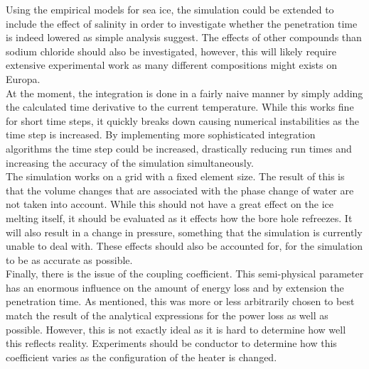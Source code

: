 \noindent
Using the empirical models for sea ice, the simulation could be extended to include the effect of salinity in order to investigate whether the penetration time is indeed lowered as simple analysis suggest. The effects of other compounds than sodium chloride should also be investigated, however, this will likely require extensive experimental work as many different compositions might exists on Europa.\\

\noindent
At the moment, the integration is done in a fairly naive manner by simply adding the calculated time derivative to the current temperature. While this works fine for short time steps, it quickly breaks down causing numerical instabilities as the time step is increased. By implementing more sophisticated integration algorithms the time step could be increased, drastically reducing run times and increasing the accuracy of the simulation simultaneously.\\

\noindent
The simulation works on a grid with a fixed element size. The result of this is that the volume changes that are associated with the phase change of water are not taken into account. While this should not have a great effect on the ice melting itself, it should be evaluated as it effects how the bore hole refreezes. It will also result in a change in pressure, something that the simulation is currently unable to deal with. These effects should also be accounted for, for the simulation to be as accurate as possible.\\

\noindent
Finally, there is the issue of the coupling coefficient. This semi-physical parameter has an enormous influence on the amount of energy loss and by extension the penetration time. As mentioned, this was more or less arbitrarily chosen to best match the result of the analytical expressions for the power loss as well as possible. However, this is not exactly ideal as it is hard to determine how well this reflects reality. Experiments should be conductor to determine how this coefficient varies as the configuration of the heater is changed.     


